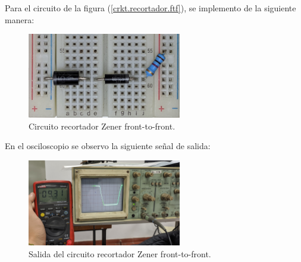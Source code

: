 \documentclass[chaptersright]{informeutn}
\begin{document}
      Para el circuito de la figura (\ref{crkt.recortador.ftf}), se implemento de la siguiente manera:
      \begin{figure}[H]
        \centering
        \includegraphics[width=0.6\textwidth]{pictures/prot_crkt4.jpg}
        \caption{Circuito recortador Zener front-to-front.}
      \end{figure}

      En el osciloscopio se observo la siguiente señal de salida:
      \begin{figure}[H]
        \centering
        \includegraphics[width=0.6\textwidth]{pictures/osc_mult-vd-crkt4.jpg}
        \caption{Salida del circuito recortador Zener front-to-front.}
      \end{figure}
\end{document}
